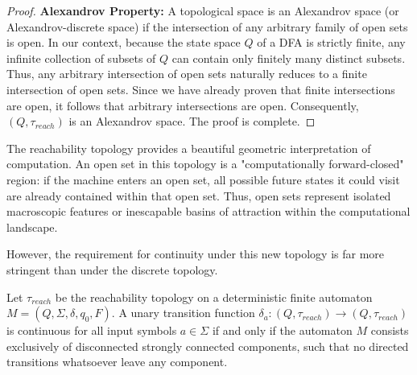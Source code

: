 \begin{proof}
\textbf{Alexandrov Property:}
A topological space is an Alexandrov space (or Alexandrov-discrete space) if the intersection of any arbitrary family of open sets is open. In our context, because the state space $Q$ of a DFA is strictly finite, any infinite collection of subsets of $Q$ can contain only finitely many distinct subsets. Thus, any arbitrary intersection of open sets naturally reduces to a finite intersection of open sets. Since we have already proven that finite intersections are open, it follows that arbitrary intersections are open. Consequently, $(Q, \tau_{reach})$ is an Alexandrov space. The proof is complete.
\end{proof}

The reachability topology provides a beautiful geometric interpretation of computation. An open set in this topology is a "computationally forward-closed" region: if the machine enters an open set, all possible future states it could visit are already contained within that open set. Thus, open sets represent isolated macroscopic features or inescapable basins of attraction within the computational landscape.

However, the requirement for continuity under this new topology is far more stringent than under the discrete topology. 

\begin{theorem}
\label{thm:strongly_connected_continuity}
Let $\tau_{reach}$ be the reachability topology on a deterministic finite automaton $M = (Q, \Sigma, \delta, q_0, F)$. A unary transition function $\delta_a: (Q, \tau_{reach}) \to (Q, \tau_{reach})$ is continuous for all input symbols $a \in \Sigma$ if and only if the automaton $M$ consists exclusively of disconnected strongly connected components, such that no directed transitions whatsoever leave any component.
\end{theorem}

